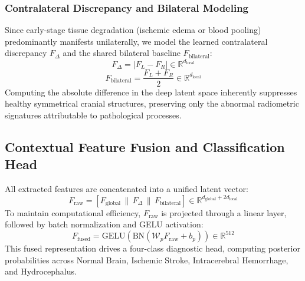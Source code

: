 \documentclass[conference]{IEEEtran}
\begin{document}
\subsubsection{Contralateral Discrepancy and Bilateral Modeling}
Since early-stage tissue degradation (ischemic edema or blood pooling) predominantly manifests unilaterally, we model the learned contralateral discrepancy $F_{\Delta}$ and the shared bilateral baseline $F_{\text{bilateral}}$:
\begin{equation}
F_{\Delta} = \left| F_L - F_R \right| \in \mathbb{R}^{d_{\text{local}}}
\end{equation}
\begin{equation}
F_{\text{bilateral}} = \frac{F_L + F_R}{2} \in \mathbb{R}^{d_{\text{local}}}
\end{equation}
Computing the absolute difference in the deep latent space inherently suppresses healthy symmetrical cranial structures, preserving only the abnormal radiometric signatures attributable to pathological processes.

\subsection{Contextual Feature Fusion and Classification Head}
All extracted features are concatenated into a unified latent vector:
\begin{equation}
F_{\text{raw}} = \left[ F_{\text{global}} \,\|\, F_{\Delta} \,\|\, F_{\text{bilateral}} \right] \in \mathbb{R}^{d_{\text{global}} + 2d_{\text{local}}}
\end{equation}
To maintain computational efficiency, $F_{\text{raw}}$ is projected through a linear layer, followed by batch normalization and GELU activation:
\begin{equation}
F_{\text{fused}} = \text{GELU}\left(\text{BN}\left(\mathcal{W}_p F_{\text{raw}} + b_p\right)\right) \in \mathbb{R}^{512}
\end{equation}
This fused representation drives a four-class diagnostic head, computing posterior probabilities across Normal Brain, Ischemic Stroke, Intracerebral Hemorrhage, and Hydrocephalus.
\end{document}
